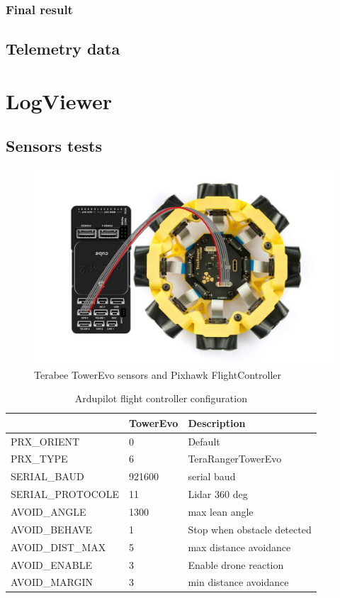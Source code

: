\subsubsection{Final result}

\subsection{Telemetry data}


\section{LogViewer}

\subsection{Sensors tests}

\begin{figure}[H]
    \centering
    \includegraphics[width=0.65\linewidth]{./projects/logviewer/tower_evo_pixhawk.jpg}
    \caption{Terabee TowerEvo sensors and Pixhawk FlightController}
\end{figure}


\begin{table}[H]
    \centering
    \begin{tabular}{|l||l|l|}
    \hline
                      & TowerEvo & Description                 \\
    \hline
    PRX\_ORIENT       & 0        & Default                     \\
    PRX\_TYPE         & 6        & TeraRangerTowerEvo          \\
    SERIAL\_BAUD      & 921600   & serial baud                 \\
    SERIAL\_PROTOCOLE & 11       & Lidar 360 deg               \\
    AVOID\_ANGLE      & 1300     & max  lean angle             \\
    AVOID\_BEHAVE     & 1        & Stop when obstacle detected \\
    AVOID\_DIST\_MAX  & 5        & max distance avoidance      \\
    AVOID\_ENABLE     & 3        & Enable drone reaction       \\
    AVOID\_MARGIN     & 3        & min distance avoidance      \\
    \hline
    \end{tabular}
    \caption{Ardupilot flight controller configuration}
    \label{table:fc_config}
\end{table}

